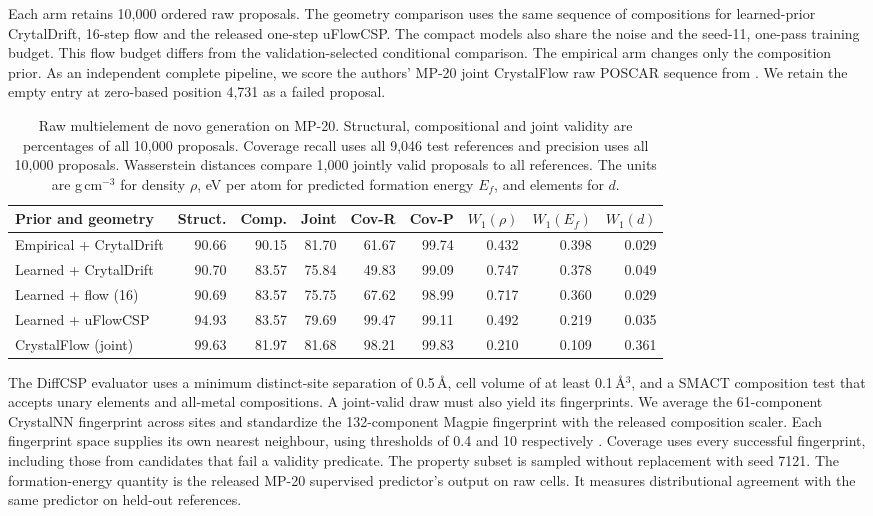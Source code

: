 Each arm retains 10,000 ordered raw proposals. The geometry comparison uses the same sequence of compositions for learned-prior CrytalDrift, 16-step flow and the released one-step uFlowCSP. The compact models also share the noise and the seed-11, one-pass training budget. This flow budget differs from the validation-selected conditional comparison. The empirical arm changes only the composition prior. As an independent complete pipeline, we score the authors' MP-20 joint CrystalFlow raw POSCAR sequence from  \cite{crystalflow}. We retain the empty entry at zero-based position 4,731 as a failed proposal.
\begin{table}[!htbp]\centering\footnotesize\setlength{\tabcolsep}{3.3pt}
\caption{Raw multielement de novo generation on MP-20. Structural, compositional and joint validity are percentages of all 10,000 proposals. Coverage recall uses all 9,046 test references and precision uses all 10,000 proposals. Wasserstein distances compare 1,000 jointly valid proposals to all references. The units are g\,cm$^{-3}$ for density $\rho$, eV per atom for predicted formation energy $E_f$, and elements for $d$.}\label{tab:full-denovo}
\begin{tabular}{lrrrrrrrr}\hline
Prior and geometry & Struct. & Comp. & Joint & Cov-R & Cov-P & $W_1(\rho)$ & $W_1(E_f)$ & $W_1(d)$\\\hline
Empirical + CrytalDrift & 90.66 & 90.15 & 81.70 & 61.67 & 99.74 & 0.432 & 0.398 & 0.029\\
Learned + CrytalDrift & 90.70 & 83.57 & 75.84 & 49.83 & 99.09 & 0.747 & 0.378 & 0.049\\
Learned + flow (16) & 90.69 & 83.57 & 75.75 & 67.62 & 98.99 & 0.717 & 0.360 & 0.029\\
Learned + uFlowCSP & 94.93 & 83.57 & 79.69 & 99.47 & 99.11 & 0.492 & 0.219 & 0.035\\
CrystalFlow (joint) & 99.63 & 81.97 & 81.68 & 98.21 & 99.83 & 0.210 & 0.109 & 0.361\\
\hline\end{tabular}\end{table}
The DiffCSP evaluator uses a minimum distinct-site separation of 0.5\,\AA, cell volume of at least 0.1\,\AA$^3$, and a SMACT composition test that accepts unary elements and all-metal compositions. A joint-valid draw must also yield its fingerprints. We average the 61-component CrystalNN fingerprint across sites and standardize the 132-component Magpie fingerprint with the released composition scaler. Each fingerprint space supplies its own nearest neighbour, using thresholds of 0.4 and 10 respectively \cite{diffcsp,matminer,smact}. Coverage uses every successful fingerprint, including those from candidates that fail a validity predicate. The property subset is sampled without replacement with seed 7121. The formation-energy quantity is the released MP-20 supervised predictor's output on raw cells. It measures distributional agreement with the same predictor on held-out references.

